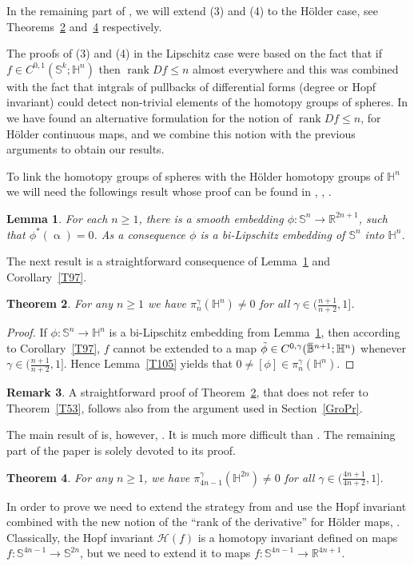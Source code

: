 \documentclass[intlimits,12pt,reqno]{amsart}
\newcommand{\Sph}{\mathbb S}
\newcommand{\bbbr}{\mathbb R}
\newcommand{\bbbb}{\mathbb B}
\newcommand{\bbbh}{\mathbb H}
\newcommand{\R}{\mathbb R}
\newcommand{\overbar}[1]{\mkern 1.7mu\overline{\mkern-1.7mu#1\mkern-1.5mu}\mkern 1.5mu}
\numberwithin{equation}{section}
\newtheorem{theorem}{Theorem}[section]
\newtheorem{lemma}[theorem]{Lemma}
\theoremstyle{definition}
\newtheorem{remark}[theorem]{Remark}
\newcommand{\HI}{\mathcal{H}}
\def\rank{\operatorname{rank}}
\begin{document}
In the remaining part of , we will extend (3) and (4) to the H\"older case, see Theorems~\ref{T108} and~\ref{th:hopfgamma} respectively. 

The proofs of (3) and (4) in the Lipschitz case were based on the fact that if $f \in C^{0,1}(\Sph^k;\mathbb{H}^n)$ then $\rank Df \leq n$ almost everywhere and this was combined with the fact that intgrals of pullbacks of differential forms (degree or Hopf invariant) could detect non-trivial elements of the homotopy groups of spheres. 
In  we have found an alternative formulation for the notion of $\rank Df \leq n$, for H\"older continuous maps, and we combine this notion with the previous arguments to obtain our results.

To link the homotopy groups of spheres with the H\"older homotopy groups of $\bbbh^n$ we will need the followings result whose proof can be found in \cite[Section~4]{Balogh-Faessler-2009}, \cite[Theorem~3.2]{DHLT}, \cite[Example~3.1]{EkholmEtnyreSullivan05}.
\begin{lemma}
\label{T107}
For each $n\geq 1$, there is a smooth embedding $\phi:\Sph^n\to\bbbr^{2n+1}$, such that $\phi^*(\upalpha)=0$. As a consequence $\phi$ is a bi-Lipschitz embedding of $\Sph^n$ into $\bbbh^n$.
\end{lemma}

The next result is a straightforward consequence of Lemma~\ref{T107} and Corollary~\ref{T97}.


\begin{theorem}
\label{T108}
For any  $n \geq 1$ we have $\pi^{\gamma}_n(\mathbb{H}^n)\neq 0$ for all $\gamma \in \big(\frac{n+1}{n+2},1\big]$.
\end{theorem}
\begin{proof}
If $\phi:\Sph^n\to\bbbh^n$ is a bi-Lipschitz embedding from Lemma~\ref{T107}, then according to Corollary~\ref{T97},
$f$ cannot be extended to a map $\tilde{\phi}\in C^{0,\gamma}(\overbar{\bbbb}^{n+1};\bbbh^n)$ whenever 
$\gamma \in \big(\frac{n+1}{n+2},1\big]$. Hence Lemma~\ref{T105} yields that $0\neq[\phi]\in\pi_n^\gamma(\bbbh^n)$.
\end{proof}
\begin{remark}
A straightforward proof of Theorem~\ref{T108}, that does not refer to Theorem~\ref{T53}, follows also from the argument used in Section~\ref{GroPr}.
\end{remark}

The main result of  is, however, . It is much more difficult than . The remaining part of the paper is solely devoted to its proof.
\begin{theorem}
\label{th:hopfgamma}
For any  $n \geq 1$, 
we have $\pi^{\gamma}_{4n-1}(\mathbb{H}^{2n})\neq 0$ for all $\gamma \in \big(\frac{4n+1}{4n+2},1\big]$.
\end{theorem}
In order to prove  we need to extend the strategy from \cite{HST14} and use the Hopf invariant combined with the new notion of the ``rank of the derivative'' for H\"older maps, . Classically, the Hopf invariant $\HI(f)$ is a homotopy invariant defined on maps $f: \mathbb{S}^{4n-1} \to \mathbb{S}^{2n}$, but we need to extend it to maps $f:\Sph^{4n-1}\to\R^{4n+1}$.
\end{document}

